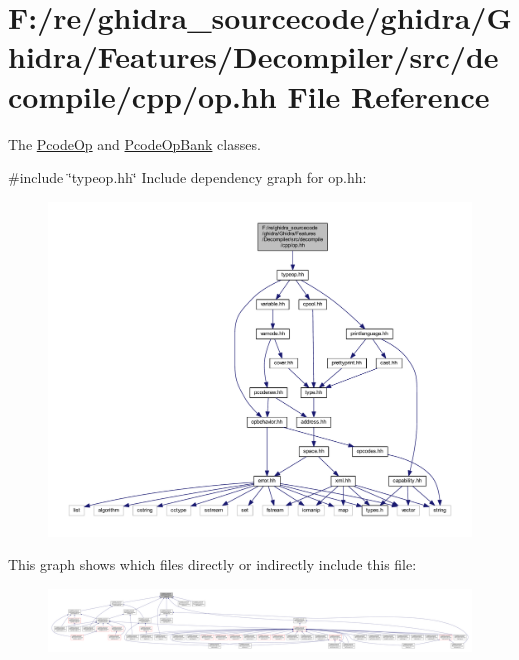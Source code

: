 \hypertarget{op_8hh}{}\section{F\+:/re/ghidra\+\_\+sourcecode/ghidra/\+Ghidra/\+Features/\+Decompiler/src/decompile/cpp/op.hh File Reference}
\label{op_8hh}


The \mbox{\hyperlink{class_pcode_op}{Pcode\+Op}} and \mbox{\hyperlink{class_pcode_op_bank}{Pcode\+Op\+Bank}} classes.  


{\ttfamily \#include \char`\"{}typeop.\+hh\char`\"{}}\newline
Include dependency graph for op.\+hh\+:
\nopagebreak
\begin{figure}[H]
\begin{center}
\leavevmode
\includegraphics[width=350pt]{op_8hh__incl}
\end{center}
\end{figure}
This graph shows which files directly or indirectly include this file\+:
\nopagebreak
\begin{figure}[H]
\begin{center}
\leavevmode
\includegraphics[width=350pt]{op_8hh__dep__incl}
\end{center}
\end{figure}
